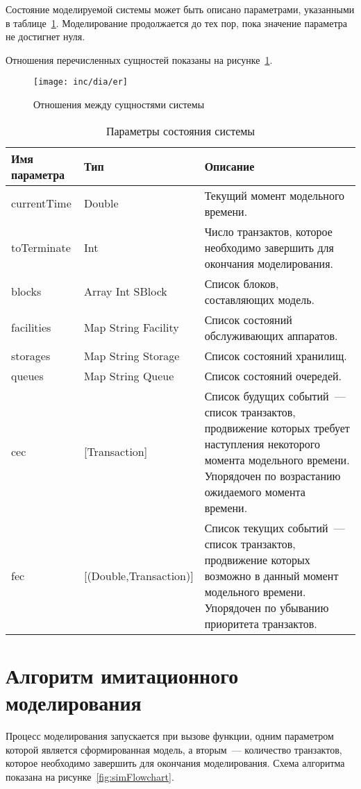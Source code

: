 Состояние моделируемой системы может быть описано параметрами, указанными в таблице~\ref{tab:simState}. Моделирование продолжается до тех пор, пока значение параметра  не достигнет нуля.

Отношения перечисленных сущностей показаны на рисунке~\ref{fig:umlSim}.

\begin{figure}[ht]
  \centering
  \texttt{[image: inc/dia/er]}
  \caption{Отношения между сущностями системы}
  \label{fig:umlSim}
\end{figure}


\begin{table}[ht!]
\caption{Параметры состояния системы}
\label{tab:simState}
\begin{tabular}{|l|l|p{}|}
\hline
Имя параметра & Тип & Описание \\
\hline
currentTime & Double & Текущий момент модельного времени.\\
\hline
toTerminate & Int & Число транзактов, которое необходимо завершить для окончания моделирования.\\
\hline
blocks & Array Int SBlock & Список блоков, составляющих модель.\\
\hline
facilities & Map String Facility & Список состояний обслуживающих аппаратов.\\
\hline
storages & Map String Storage & Список состояний хранилищ.\\
\hline
queues & Map String Queue & Список состояний очередей.\\
\hline
cec & [Transaction] & Список будущих событий~--- список транзактов, продвижение которых требует наступления некоторого момента модельного времени. Упорядочен по возрастанию ожидаемого момента времени. \\
\hline
fec & [(Double,Transaction)] & Список текущих событий~--- список транзактов, продвижение которых возможно в данный момент модельного времени. Упорядочен по убыванию приоритета транзактов. \\
\hline
\end{tabular}
\end{table}


\section{Алгоритм имитационного моделирования}

Процесс моделирования запускается при вызове функции, одним параметром которой является сформированная модель, а вторым~--- количество транзактов, которое необходимо завершить для окончания моделирования.  Схема алгоритма показана на рисунке~\ref{fig:simFlowchart}.

